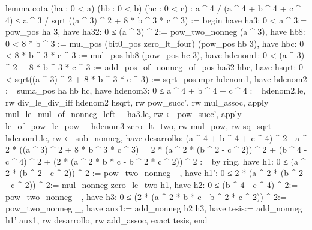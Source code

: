 \begin{leancode}
lemma cota (ha : 0 < a) (hb : 0 < b) (hc : 0 < c) :
  a ^ 4 / (a ^ 4 + b ^ 4 + c ^ 4) ≤
  a ^ 3 / sqrt ((a ^ 3) ^ 2 + 8 * b ^ 3 * c ^ 3) :=
begin
  have ha3: 0 < a ^ 3:= pow_pos ha 3,
  have ha32: 0 ≤  (a ^ 3) ^ 2:= pow_two_nonneg (a ^ 3),
  have hb8: 0 < 8 * b ^ 3 := mul_pos (bit0_pos zero_lt_four) (pow_pos hb 3),
  have hbc: 0 < 8 * b ^ 3 * c ^ 3 := mul_pos hb8 (pow_pos hc 3),
  have hdenom1: 0 < (a ^ 3) ^ 2 + 8 * b ^ 3 * c ^ 3 := 
    add_pos_of_nonneg_of_pos ha32 hbc,
  have hsqrt: 0 < sqrt((a ^ 3) ^ 2 + 8 * b ^ 3 * c ^ 3) := 
    sqrt_pos.mpr hdenom1,
  have hdenom2 := suma_pos ha hb hc,
  have hdenom3: 0 ≤ a ^ 4 + b ^ 4 + c ^ 4 := hdenom2.le,
  rw div_le_div_iff hdenom2 hsqrt,
  rw pow_succ',
  rw mul_assoc,
  apply mul_le_mul_of_nonneg_left _ ha3.le,
  rw ← pow_succ',
  apply le_of_pow_le_pow _ hdenom3 zero_lt_two,
  rw mul_pow,
  rw sq_sqrt hdenom1.le,
  rw ← sub_nonneg,
  have desarrollo: (a ^ 4 + b ^ 4 + c ^ 4) ^ 2 - 
      a ^ 2 * ((a ^ 3) ^ 2 + 8 * b ^ 3 * c ^ 3)
      = 2 * (a ^ 2 * (b ^ 2 - c ^ 2)) ^ 2 + (b ^ 4 - c ^ 4) ^ 2 +
      (2 * (a ^ 2 * b * c - b ^ 2 * c ^ 2)) ^ 2 := by ring,
  have h1: 0 ≤ (a ^ 2 * (b ^ 2 - c ^ 2)) ^ 2 := pow_two_nonneg _,
  have h1': 0 ≤ 2 * (a ^ 2 * (b ^ 2 - c ^ 2)) ^ 2:= 
    mul_nonneg zero_le_two h1,
  have h2: 0 ≤ (b ^ 4 - c ^ 4) ^ 2:= pow_two_nonneg _,
  have h3: 0 ≤ (2 * (a ^ 2 * b * c - b ^ 2 * c ^ 2)) ^ 2:= 
    pow_two_nonneg _,
  have aux1:= add_nonneg h2 h3,
  have tesis:= add_nonneg h1' aux1,
  rw desarrollo,
  rw add_assoc,
  exact tesis,
end
\end{leancode}

